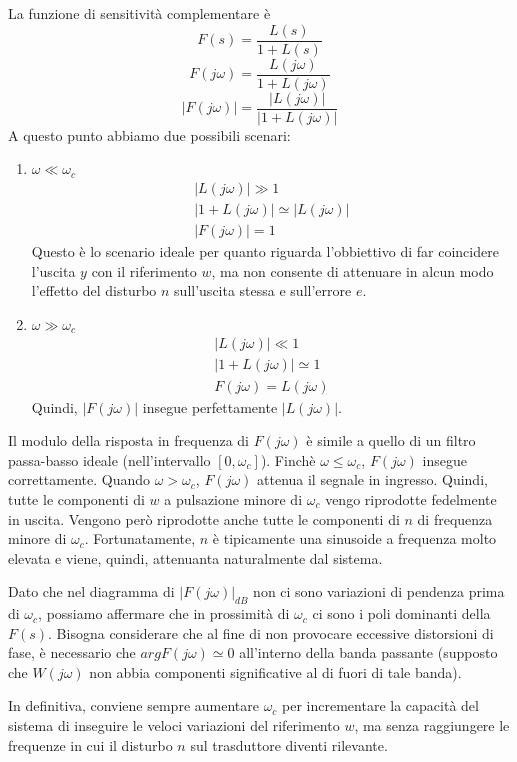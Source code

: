 \documentclass[a4paper]{report}
\begin{document}
La funzione di sensitivit\`a complementare \`e
\[
F(s) = \dfrac{L(s)}{1 + L(s)}
\]
\[
F(j \omega) = \dfrac{L(j \omega)}{1 + L(j \omega)}
\]
\[
|F(j \omega)| = \dfrac{|L(j \omega)|}{|1 + L(j \omega)|}
\]
A questo punto abbiamo due possibili scenari:\begin{enumerate}
\item $\omega \ll \omega_c$
  \[
  \begin{array}{l}
    |L(j \omega)| \gg 1\\
    |1 + L(j \omega)| \simeq |L(j \omega)|\\
    |F(j \omega)| = 1
  \end{array}
  \]
  Questo \`e lo scenario ideale per quanto riguarda l'obbiettivo di far
  coincidere l'uscita $y$ con il riferimento $w$, ma non consente
  di attenuare in alcun modo l'effetto del disturbo $n$ sull'uscita
  stessa e sull'errore $e$.
\item $\omega \gg \omega_c$
  \[
  \begin{array}{l}
    |L(j \omega)| \ll 1\\
    |1 + L(j \omega)| \simeq 1\\
    F(j \omega) = L(j \omega)
  \end{array}
  \]
  Quindi, $|F(j \omega)|$ insegue perfettamente $|L(j \omega)|$.
\end{enumerate}
Il modulo della risposta in frequenza di $F(j \omega)$ \`e simile a
quello di un filtro passa-basso ideale (nell'intervallo $[0,
\omega_c]$). Finch\`e $\omega \leq \omega_c$, $F(j
\omega)$ insegue correttamente. Quando $\omega > \omega_c$, $F(j
\omega)$ attenua il segnale in ingresso. Quindi, tutte le componenti
di $w$ a pulsazione minore di $\omega_c$ vengo riprodotte
fedelmente in uscita. Vengono per\`o riprodotte anche tutte le
componenti di $n$ di frequenza minore di $\omega_c$. Fortunatamente,
$n$ \`e tipicamente una sinusoide a frequenza molto elevata e viene,
quindi, attenuanta naturalmente dal sistema.

Dato che nel diagramma di $|F(j \omega)|_{dB}$ non ci sono variazioni
di pendenza prima di $\omega_c$, possiamo affermare che in
prossimit\`a di $\omega_c$ ci sono i poli dominanti della
$F(s)$. Bisogna considerare che al fine di non provocare eccessive
distorsioni di fase, \`e necessario che $arg F(j \omega) \simeq 0$
all'interno della banda passante (supposto che $W(j \omega)$ non
abbia componenti significative al di fuori di tale banda).
  
In definitiva, conviene sempre aumentare $\omega_c$ per incrementare
la capacit\`a del sistema di inseguire le veloci variazioni del
riferimento $w$, ma senza raggiungere le frequenze in cui il
disturbo $n$ sul trasduttore diventi rilevante.
\end{document}
